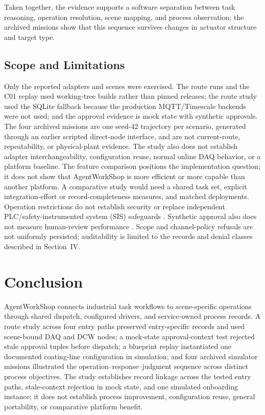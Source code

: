 Taken together, the evidence supports a software separation between task
reasoning, operation resolution, scene mapping, and process observation; the
archived missions show that this sequence survives changes in actuator
structure and target type.

\subsection{Scope and Limitations}
Only the reported adapters and scenes were exercised. The route runs and the
C01 replay used working-tree builds rather than pinned releases; the route
study used the SQLite fallback because the production MQTT/Timescale backends
were not used; and the approval evidence is mock state with synthetic
approvals. The four archived missions are one seed-42 trajectory per
scenario, generated through an earlier scripted direct-node interface, and are
not current-route, repeatability, or physical-plant evidence. The study also
does not establish adapter interchangeability, configuration reuse, normal
online DAQ behavior, or a platform baseline.
The feature comparison positions the implementation question; it does not show
that AgentWorkShop is more efficient or more capable than another platform. A
comparative study would need a shared task set, explicit integration-effort or
record-completeness measures, and matched deployments. Operation restrictions
do not establish security
\cite{greshake2023injection,liu2024pinjection,iec62443-3-3} or replace
independent PLC/safety-instrumented system (SIS) safeguards \cite{iec61511}.
Synthetic approval also does not measure human-review performance
\cite{parasuramanmanzey2010complacency,bainbridge1983ironies}.
Scope and channel-policy refusals are not uniformly persisted; auditability is
limited to the records and denial classes described in Section~IV.

\section{Conclusion}
\label{sec:conclusion}
AgentWorkShop connects industrial task workflows to scene-specific operations
through shared dispatch, configured drivers, and service-owned process records.
A route study across four entry paths preserved entry-specific records and used
scene-bound DAQ and DCW nodes; a mock-state approval-context test rejected
stale approval tuples before dispatch; a blueprint replay instantiated one
documented coating-line configuration in simulation; and four archived
simulator missions illustrated the operation--response--judgment sequence
across distinct process objectives. The study establishes record linkage
across the tested entry paths, stale-context rejection in mock state, and one
simulated onboarding instance; it does not establish process improvement,
configuration reuse, general portability, or comparative platform benefit.
